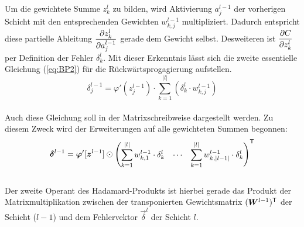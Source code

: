 \begin{appendices}
\begin{equation}
\end{equation}
\\
Um die gewichtete Summe $z_k^l$ zu bilden, wird
Aktivierung $a_j^{l-1}$ der vorherigen Schicht mit den entsprechenden Gewichten
$w_{k,j}^{l-1}$ multipliziert.
Dadurch entspricht diese partielle Ableitung $\displaystyle\frac{\partial z_k^l}{\partial a_j^{l-1}}$ gerade dem
Gewicht selbst. Desweiteren ist $\displaystyle\frac{\partial C}{\partial z_k^l}$ per Definition der
Fehler $\delta_k^l$. Mit dieser Erkenntnis lässt sich die zweite essentielle
Gleichung (\ref{eq:BP2}) für die Rückwärtsprogagierung aufstellen.
\\
\begin{equation}\tag{BP2}\label{eq:BP2}
  \delta_j^{l-1} = \varphi'(z_j^{l-1}) \cdot \sum_{k=1}^{|l|} \left( \delta_k^l \cdot w_{k,j}^{l-1} \right)
\end{equation}
\\
Auch diese Gleichung soll in der Matrixschreibweise dargestellt werden. Zu
diesem Zweck wird der Erweiterungen auf alle gewichteten Summen begonnen:
\\
\begin{equation*}
  \bm{\delta}^{l-1} = \bm{\varphi}'[\bm{z}^{l-1}] \odot \begin{pmatrix} \displaystyle\sum_{k=1}^{|l|} w_{k,1}^{l-1} \cdot \delta_k^l & \cdots & \displaystyle\sum_{k=1}^{|l|} w_{k,|l-1|}^{l-1} \cdot \delta_k^l \end{pmatrix}^{\mathsf{T}}
\end{equation*}
\\
Der zweite Operant des Hadamard-Produkts ist hierbei gerade das Produkt der
Matrixmultiplikation zwischen
der transponierten Gewichtsmatrix $(\bm{W}^{l-1})^{\mathsf{T}}$ der Schicht ($l-1$)
und dem Fehlervektor $\vec{\delta}^l$ der Schicht $l$.


\end{appendices}
